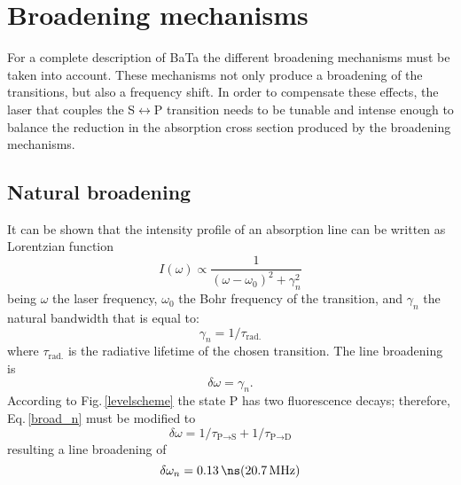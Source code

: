 \section{Broadening mechanisms}
For a complete description of BaTa the different broadening mechanisms must be taken into account. These mechanisms not only produce a broadening of the transitions, but also a frequency shift. In order to compensate these effects, the laser that couples the S$\leftrightarrow$P transition needs to be tunable and intense enough to balance the reduction in the absorption cross section produced by the broadening mechanisms.

\subsection{Natural broadening} 
It can be shown that the intensity profile of an absorption line can be written as Lorentzian function \cite{Demtroder03}
\begin{equation}
\label{Lorentz}
I(\omega)\propto\frac{1}{(\omega-\omega_0)^2+\gamma_n^2}
\end{equation}
being $\omega$ the laser frequency, $\omega_0$ the Bohr frequency of the transition, and $\gamma_n$ the natural bandwidth that is equal to:
\begin{equation}
\label{gamma_n}
\gamma_n=1/\tau_{\text{rad.}}
\end{equation}
where $\tau_{\text{rad.}}$ is the radiative lifetime of the chosen transition. The line broadening is 
\begin{equation}
\label{broad_n}
\delta\omega=\gamma_n.
\end{equation}
According to Fig.\,\ref{levelscheme} the state P has two fluorescence decays; therefore, Eq.\,\ref{broad_n} must be modified to
\begin{equation}
\delta\omega=1/\tau_{\text{P}\rightarrow\text{S}}+1/\tau_{\text{P}\rightarrow\text{D}}
\end{equation}
resulting a line broadening of
\begin{equation}
\delta\omega_n=0.13\,\text{\ns} (20.7\,\text{MHz})
\end{equation}

